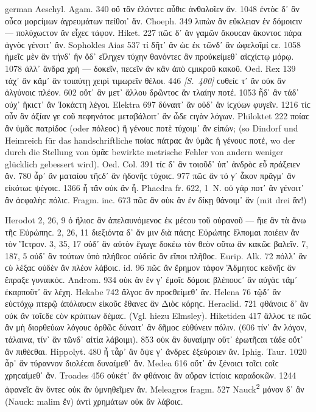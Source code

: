 \begin{otherlanguage*}{german}
Aeschyl. Agam. 340 οὔ τἂν ἑλόντεϲ αὖθιϲ ἀνθαλοῖεν ἄν. 1048 ἐντὸϲ δ᾽ ἂν οὖϲα μορϲίμων ἀγρευμάτων πείθοι᾽ ἄν. Choeph. 349 λιπὼν ἂν εὔκλειαν ἐν δόμοιϲιν — πολύχωϲτον ἂν εἶχεϲ τάφον. Hiket. 227 πῶϲ δ᾽ ἂν γαμῶν ἄκουϲαν ἄκοντοϲ πάρα ἁγνὸϲ γένοιτ᾽ ἄν. Sophokles Aias 537 τί δῆτ᾽ ἂν ὡϲ ἐκ τῶνδ᾽ ἂν ὠφελοῖμί ϲε. 1058 ἡμεῖϲ μὲν ἂν τήνδ᾽ ἣν ὅδ᾽ εἴληχεν τύχην θανόντεϲ ἂν προὐκείμεθ᾽ αἰϲχίϲτῳ μόρῳ. 1078 ἀλλ᾽ ἄνδρα χρὴ — δοκεῖν, πεϲεῖν ἂν κἂν ἀπὸ ϲμικροῦ κακοῦ. Oed. Rex 139 τάχ᾽ ἂν κἄμ᾽ ἂν τοιαύτῃ χειρὶ τιμωρεῖν θέλοι. 446 \hypertarget{p400}{\emph{[S.~400]}}\label{p400} ϲυθείϲ τ᾽ ἂν οὐκ ἂν ἀλγύνοιϲ πλέον. 602 οὔτ᾽ ἂν μετ᾽ ἄλλου δρῶντοϲ ἂν τλαίην ποτέ. 1053 ἧδ᾽ ἂν τάδ᾽ οὐχ᾽ ἥκιϲτ᾽ ἂν Ἰοκάϲτη λέγοι. Elektra 697 δύναιτ᾽ ἂν οὐδ᾽ ἂν ἰϲχύων φυγεῖν. 1216 τίϲ οὖν ἂν ἀξίαν γε ϲοῦ πεφηνότοϲ μεταβάλοιτ᾽ ἂν ὧδε ϲιγὰν λόγων. Philoktet 222 ποίαϲ ἂν ὑμᾶϲ πατρίδοϲ (oder πόλεοϲ) ἢ γένουϲ ποτὲ τύχοιμ᾽ ἂν εἰπών; (so Dindorf und Heimreich für das handschriftliche ποίαϲ πάτραϲ ἂν ὑμᾶϲ ἢ γένουϲ ποτέ, wo der durch die Stellung von ὑμᾶϲ bewirkte metrische Fehler von andern weniger glücklich gebessert wird). Oed. Col. 391 τίϲ δ᾽ ἂν τοιοῦδ᾽ ὑπ᾽ ἀνδρὸϲ εὖ πράξειεν ἄν. 780 ἆρ᾽ ἂν ματαίου τῆϲδ᾽ ἂν ἡδονῆϲ τύχοιϲ. 977 πῶϲ ἂν τό γ᾽ ἆκον πρᾶγμ᾽ ἂν εἰκότωϲ ψέγοιϲ. 1366 ἦ τἂν οὐκ ἂν ἦ. Phaedra fr. 622, 1~Ν. οὐ γάρ ποτ᾽ ἂν γένοιτ᾽ ἂν ἀϲφαλὴϲ πόλιϲ. Fragm. inc. 673 πῶϲ ἂν οὐκ ἂν ἐν δίκῃ θάνοιμ᾽ ἄν (mit drei ἄν!)

Herodot 2, 26, 9 ὁ ἥλιοϲ ἂν ἀπελαυνόμενοϲ ἐκ μέϲου τοῦ οὐρανοῦ — ἤιε ἂν τὰ ἄνω τῆϲ Εὐρώπηϲ. 2, 26, 11 διεξιόντα δ᾽ ἄν μιν διὰ πάϲηϲ Εὐρώπηϲ ἔλπομαι ποιέειν ἂν τὸν Ἴϲτρον. 3, 35, 17 οὐδ᾽ ἂν αὐτὸν ἔγωγε δοκέω τὸν θεὸν οὕτω ἂν κακῶϲ βαλεῖν. 7, 187, 5 οὐδ᾽ ἂν τούτων ὑπὸ πλήθεοϲ οὐδεὶϲ ἂν εἴποι πλῆθοϲ. Eurip. Alk. 72 πόλλ᾽ ἂν ϲὺ λέξαϲ οὐδὲν ἂν πλέον λάβοιϲ. id. 96 πῶϲ ἂν ἔρημον τάφον Ἄδμητοϲ κεδνῆϲ ἂν ἔπραξε γυναικόϲ. Androm. 934 οὐκ ἂν ἔν γ᾽ ἐμοῖϲ δόμοιϲ βλέπουϲ᾽ ἂν αὐγὰϲ τἄμ᾽ ἐκαρποῦτ᾽ ἂν λέχη. Hekabe 742 ἄλγοϲ ἂν προϲ\-θεί\-μεθ᾽ ἄν. Helena 76 τῷδ᾽ ἂν εὐϲτόχῳ πτερῷ ἀπόλαυϲιν εἰκοῦϲ ἔθανεϲ ἂν Διὸϲ κόρηϲ. Heraclid. 721 φθάνοιϲ δ᾽ ἂν οὐκ ἂν τοῖϲδε ϲὸν κρύπτων δέμαϲ. (Vgl. hiezu Elmsley). Hiketiden 417 ἄλλοϲ τε πῶϲ ἂν μὴ διορθεύων λόγουϲ ὀρθῶϲ δύναιτ᾽ ἂν δῆμοϲ εὐθύνειν πόλιν. (606 τίν᾽ ἂν λόγον, τάλαινα, τίν᾽ ἂν τῶνδ᾽ αἰτία λάβοιμι). 853 οὐκ ἂν δυναίμην οὔτ᾽ ἐρωτῆϲαι τάδε οὔτ᾽ ἂν πιθέϲθαι. Hippolyt. 480 ἦ τἆρ᾽ ἂν ὄψε γ᾽ ἄνδρεϲ ἐξεύροιεν ἄν. Iphig. Taur. 1020 ἆρ᾽ ἂν τύραννον διολέϲαι δυναίμεθ᾽ ἄν. Medea 616 οὔτ᾽ ἂν ξένοιϲι τοῖϲι ϲοῖϲ χρηϲαίμεθ᾽ ἄν. Troades 456 οὐκέτ᾽ ἂν φθάνοιϲ ἂν αὔραν ἱϲτίοιϲ καραδοκῶν. 1244 ἀφανεῖϲ ἂν ὄντεϲ οὐκ ἂν ὑμνηθεῖμεν ἄν. Meleagros fragm. 527 Nauck\textsuperscript{2} μόνον δ᾽ ἂν (Nauck: malim ἕν) ἀντὶ χρημάτων οὐκ ἂν λάβοιϲ.


\end{otherlanguage*}

